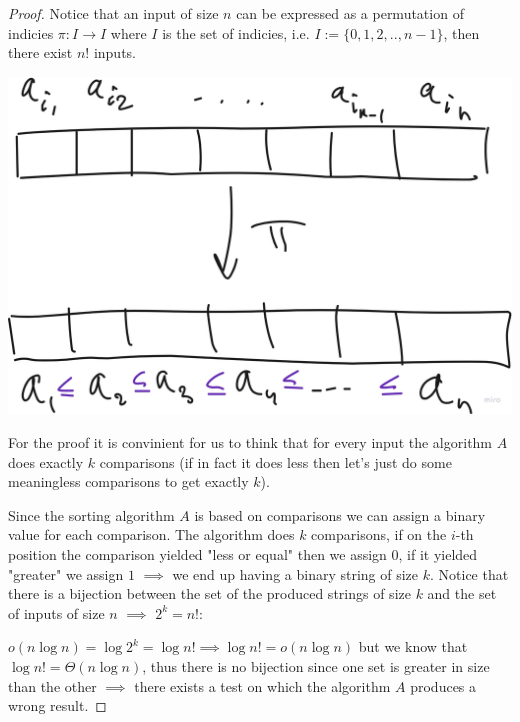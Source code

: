 \begin{proof}

    Notice that an input of size $n$ can be expressed as a permutation of indicies $\pi: I \to I$ where $I$ is the set of indicies, i.e. $I:=\{0, 1, 2, .., n-1\}$, then there exist $n!$ inputs.

    \begin{center}
        \includegraphics[scale=0.18]{./assets/13-sorting-algorithms/3.png}
    \end{center}

    For the proof it is convinient for us to think that for every input the algorithm $A$ does exactly $k$ comparisons (if in fact it does less then let's just do some meaningless comparisons to get exactly $k$).

    Since the sorting algorithm $A$ is based on comparisons we can assign a binary value for each comparison. The algorithm does $k$ comparisons, if on the $i$-th position the comparison yielded "less or equal" then we assign $0$, if it yielded "greater" we assign $1$ $\implies$ we end up having a binary string of size $k$. Notice that there is a bijection between the set of the produced strings of size $k$ and the set of inputs of size $n$ $\implies$ $2^k = n!$:

    $o(n \log{n}) = \log{2^k} = \log{n!} \implies \log{n!} = o(n \log{n})$ but we know that $\log{n!} = \Theta(n \log{n})$, thus there is no bijection since one set is greater in size than the other $\implies$ there exists a test on which the algorithm $A$ produces a wrong result.

\end{proof}



